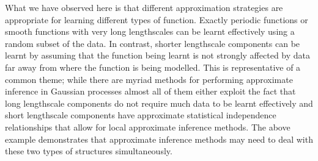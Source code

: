 What we have observed here is that different approximation strategies are appropriate for learning different types of function.
Exactly periodic functions or smooth functions with very long lengthscales can be learnt effectively using a random subset of the data.
In contrast, shorter lengthscale components can be learnt by assuming that the function being learnt is not strongly affected by data far away from where the function is being modelled.
This is representative of a common theme; while there are myriad methods for performing approximate inference in Gaussian processes almost all of them either exploit the fact that long lengthscale components do not require much data to be learnt effectively and short lengthscale components have approximate statistical independence relationships that allow for local approximate inference methods.
The above example demonstrates that approximate inference methods may need to deal with these two types of structures simultaneously.

